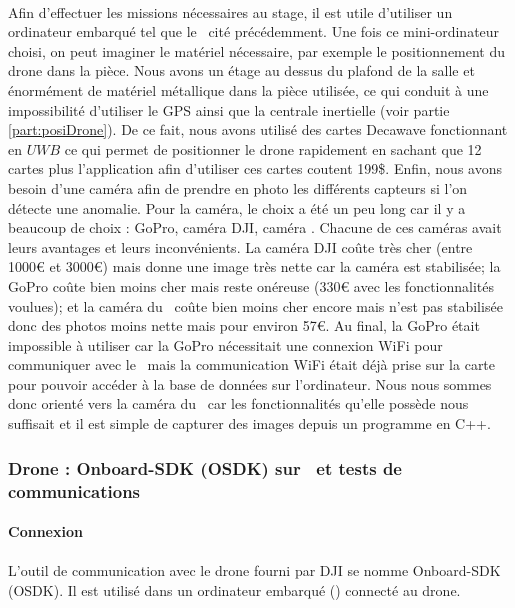         \paragraph*{}
        Afin d'effectuer les missions nécessaires au stage, il est utile d'utiliser un ordinateur embarqué tel que le \rpi ~cité précédemment. Une fois ce mini-ordinateur choisi, on peut imaginer le matériel nécessaire, par exemple le positionnement du drone dans la pièce. Nous avons un étage au dessus du plafond de la salle et énormément de matériel métallique dans la pièce utilisée, ce qui conduit à une impossibilité d'utiliser le GPS ainsi que la centrale inertielle (voir partie \ref{part:posiDrone}). De ce fait, nous avons utilisé des cartes Decawave fonctionnant en $UWB$ ce qui permet de positionner le drone rapidement en sachant que 12 cartes plus l'application afin d'utiliser ces cartes coutent 199\$.
        Enfin, nous avons besoin d'une caméra afin de prendre en photo les différents capteurs si l'on détecte une anomalie. Pour la caméra, le choix a été un peu long car il y a beaucoup de choix : GoPro, caméra DJI, caméra \rpi. Chacune de ces caméras avait leurs avantages et leurs inconvénients. La caméra DJI coûte très cher (entre 1000€ et 3000€) mais donne une image très nette car la caméra est stabilisée; la GoPro coûte bien moins cher mais reste onéreuse (330€ avec les fonctionnalités voulues); et la caméra du \rpi ~coûte bien moins cher encore mais n'est pas stabilisée donc des photos moins nette mais pour environ 57€. Au final, la GoPro était impossible à utiliser car la GoPro nécessitait une connexion WiFi pour communiquer avec le \rpi ~mais la communication WiFi était déjà prise sur la carte pour pouvoir accéder à la base de données sur l'ordinateur. Nous nous sommes donc orienté vers la caméra du \rpi ~car les fonctionnalités qu'elle possède nous suffisait et il est simple de capturer des images depuis un programme en C++.
        
    \subsubsection{Drone : Onboard-SDK (OSDK) sur \rpi ~et tests de communications}
        \paragraph{Connexion}
            \paragraph*{}
            L'outil de communication avec le drone fourni par DJI se nomme Onboard-SDK (OSDK). Il est utilisé dans un ordinateur embarqué (\rpi) connecté au drone.
            
